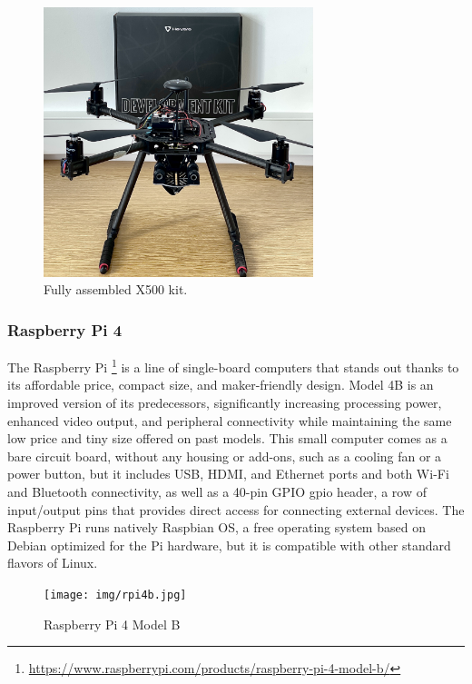 \begin{figure}
  \centering
  \includegraphics[width=0.7\textwidth,keepaspectratio]{img/X500-assembled.jpg}
  \caption{Fully assembled X500 kit.}
  \label{fig:x500}
\end{figure}

\subsubsection{Raspberry Pi 4}
\label{subsec:rpi}
The Raspberry Pi \footnote{\url{https://www.raspberrypi.com/products/raspberry-pi-4-model-b/}} is a line of single-board computers that stands out thanks to its affordable price,
compact size, and maker-friendly design. Model 4B is an improved version of its predecessors,
significantly increasing processing power, enhanced video output, and peripheral connectivity
while maintaining the same low price and tiny size offered on past models.
This small computer comes as a bare circuit board,
without any housing or add-ons, such as a cooling fan or a power button,
but it includes USB, HDMI, and Ethernet ports and both Wi-Fi and Bluetooth connectivity,
as well as a 40-pin GPIO \gls{gpio} header, a row of input/output pins that provides direct access for connecting external devices.
The Raspberry Pi runs natively Raspbian OS, a free operating system based on Debian optimized for the Pi hardware, but it is compatible with other standard flavors of Linux.

\begin{figure}
  \centering
  \texttt{[image: img/rpi4b.jpg]}
  \caption{Raspberry Pi 4 Model B}
  \label{fig:rpi4b}
\end{figure}
